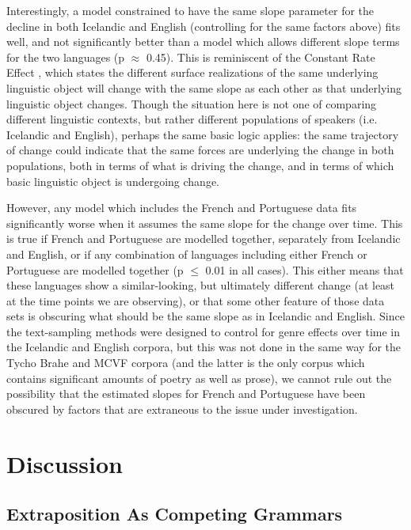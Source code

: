 Interestingly, a model constrained to have the same slope parameter for the decline in both Icelandic and English (controlling for the same factors above) fits well, and not significantly better than a model which allows different slope terms for the two languages (p $\approx$ 0.45). This is reminiscent of the Constant Rate Effect \citep[][among others]{kroch1989, pintzuk1991, santorini1993a}, which states the different surface realizations of the same underlying linguistic object will change with the same slope as each other as that underlying linguistic object changes. Though the situation here is not one of comparing different linguistic contexts, but rather different populations of speakers (i.e. Icelandic and English), perhaps the same basic logic applies: the same trajectory of change could indicate that the same forces are underlying the change in both populations, both in terms of what is driving the change, and in terms of which basic linguistic object is undergoing change. 

However, any model which includes the French and Portuguese data fits significantly worse when it assumes the same slope for the change over time. This is true if French and Portuguese are modelled together, separately from Icelandic and English, or if any combination of languages including either French or Portuguese are modelled together (p $\leq$ 0.01 in all cases). This either means that these languages show a similar-looking, but ultimately different change (at least at the time points we are observing), or that some other feature of those data sets is obscuring what should be the same slope as in Icelandic and English. Since the text-sampling methods were designed to control for genre effects over time in the Icelandic and English corpora, but this was not done in the same way for the Tycho Brahe and MCVF corpora (and the latter is the only corpus which contains significant amounts of poetry as well as prose), we cannot rule out the possibility that the estimated slopes for French and Portuguese have been obscured by factors that are extraneous to the issue under investigation.



\section{Discussion}
\subsection{Extraposition As Competing Grammars}
\label{compete}

